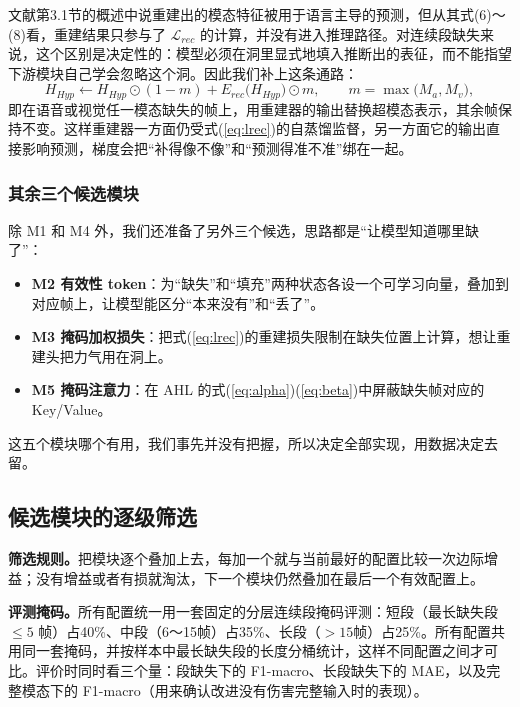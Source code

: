 文献\cite{shi2026ldsd}第3.1节的概述中说重建出的模态特征被用于语言主导的预测，但从其式(6)～(8)看，重建结果只参与了 $\mathcal{L}_{rec}$ 的计算，并没有进入推理路径。对连续段缺失来说，这个区别是决定性的：模型必须在洞里显式地填入推断出的表征，而不能指望下游模块自己学会忽略这个洞。因此我们补上这条通路：
\begin{equation}\label{eq:inpaint}
H_{Hyp}\leftarrow H_{Hyp}\odot(1-m)+E_{rec}\big(H_{Hyp}\big)\odot m,\qquad m=\max\big(M_a,M_v\big),
\end{equation}
即在语音或视觉任一模态缺失的帧上，用重建器的输出替换超模态表示，其余帧保持不变。这样重建器一方面仍受式(\ref{eq:lrec})的自蒸馏监督，另一方面它的输出直接影响预测，梯度会把“补得像不像”和“预测得准不准”绑在一起。

\subsubsection{其余三个候选模块}

除 M1 和 M4 外，我们还准备了另外三个候选，思路都是“让模型知道哪里缺了”：
\begin{itemize}
\item \textbf{M2 有效性 token}：为“缺失”和“填充”两种状态各设一个可学习向量，叠加到对应帧上，让模型能区分“本来没有”和“丢了”。
\item \textbf{M3 掩码加权损失}：把式(\ref{eq:lrec})的重建损失限制在缺失位置上计算，想让重建头把力气用在洞上。
\item \textbf{M5 掩码注意力}：在 AHL 的式(\ref{eq:alpha})(\ref{eq:beta})中屏蔽缺失帧对应的 Key/Value。
\end{itemize}
这五个模块哪个有用，我们事先并没有把握，所以决定全部实现，用数据决定去留。

\subsection{候选模块的逐级筛选}\label{sec:screen}

\textbf{筛选规则。}把模块逐个叠加上去，每加一个就与当前最好的配置比较一次边际增益；没有增益或者有损就淘汰，下一个模块仍然叠加在最后一个有效配置上。

\textbf{评测掩码。}所有配置统一用一套固定的分层连续段掩码评测：短段（最长缺失段 $\le5$ 帧）占40\%、中段（6～15帧）占35\%、长段（$>15$帧）占25\%。所有配置共用同一套掩码，并按样本中最长缺失段的长度分桶统计，这样不同配置之间才可比。评价时同时看三个量：段缺失下的 F1-macro、长段缺失下的 MAE，以及完整模态下的 F1-macro（用来确认改进没有伤害完整输入时的表现）。

